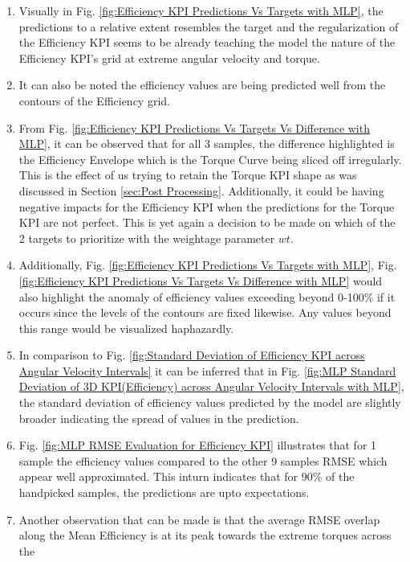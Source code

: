 \documentclass{report} %
\begin{document}
\begin{enumerate}[nosep]
    \item Visually in Fig. \ref{fig:Efficiency KPI Predictions Vs Targets with MLP}, the predictions to a relative extent resembles the target and the regularization 
    of the Efficiency \ac{KPI} seems to be already teaching the model the nature of the Efficiency \ac{KPI}'s grid at extreme angular velocity and torque. 
    \item It can also be noted the efficiency values are being predicted well from the contours of the Efficiency grid.
    \item From Fig. \ref{fig:Efficiency KPI Predictions Vs Targets Vs Difference with MLP}, it can be observed that for all 3 samples, the difference highlighted is 
    the Efficiency Envelope which is the Torque Curve being sliced off irregularly. This is the effect of us trying to retain the Torque \ac{KPI} shape as was 
    discussed in Section \ref{sec:Post Processing}.
    Additionally, it could be having negative impacts for the Efficiency \ac{KPI} when the predictions for the Torque \ac{KPI} are not perfect.
    This is yet again a decision to be made on which of the 2 targets to prioritize with the weightage parameter \textit{$wt$}. 
    \item Additionally, Fig. \ref{fig:Efficiency KPI Predictions Vs Targets with MLP}, Fig. \ref{fig:Efficiency KPI Predictions Vs Targets Vs Difference with MLP} would also 
    highlight the anomaly of efficiency values exceeding beyond 0-100\% if it occurs since the levels of the contours are fixed likewise. 
    Any values beyond this range would be visualized haphazardly.
    \item In comparison to Fig. \ref{fig:Standard Deviation of Efficiency KPI across Angular Velocity Intervals} it can be inferred that in Fig. 
    \ref{fig:MLP Standard Deviation of 3D KPI(Efficiency) across Angular Velocity Intervals with MLP}, the standard deviation of efficiency values predicted by the model 
    are slightly broader indicating the spread of values in the prediction.
    \item Fig. \ref{fig:MLP RMSE Evaluation for Efficiency KPI} illustrates that for 1 sample the efficiency values compared to the other 9 samples \ac{RMSE} which appear 
    well approximated. This inturn indicates that for 90\% of the handpicked samples, the predictions are upto expectations.
    \item Another observation that can be made is that the average \ac{RMSE} overlap along the Mean Efficiency is at its peak towards the extreme torques across the 

\end{enumerate}
\end{document}
